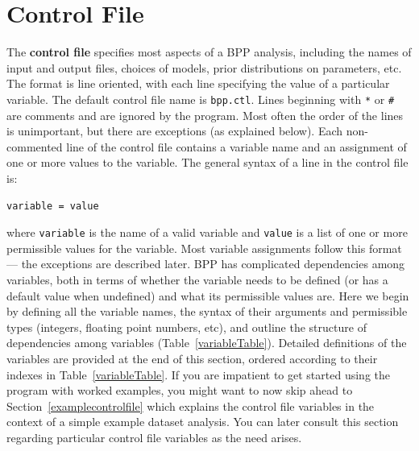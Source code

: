 \documentclass[a4paper]{book}
\numberwithin{equation}{section} \renewcommand{\baselinestretch}{0.55}
\begin{document}
\section{Control File} \label{ctrlfile} The \textbf{control file} specifies
most aspects of a BPP analysis, including the names of input and
output files, choices of models, prior distributions on parameters,
etc.  The format is line oriented, with each line specifying the value
of a particular variable.  The default control file name is
\texttt{bpp.ctl}.  Lines beginning with \texttt{*} or \texttt{\#} are
comments and are ignored by the program.  Most often the order of the
lines is unimportant, but there are exceptions (as explained
below). Each non-commented line of the control file contains a
variable name and an assignment of one or more values to the
variable. The general syntax of a line in the control file is:
\begin{verbatim}
variable = value
\end{verbatim}
where \texttt{variable} is the name of a valid variable and
\texttt{value} is a list of one or more permissible values for the
variable.  Most variable assignments follow this format --- the
exceptions are described later.  BPP has complicated dependencies
among variables, both in terms of whether the variable needs to be
defined (or has a default value when undefined) and what
its permissible values are. Here we begin by defining
all the variable names, the syntax of their arguments and permissible
types (integers, floating point numbers, etc), and outline the
structure of dependencies among variables
(Table~\ref{variableTable}). Detailed definitions of the variables are
provided at the end of this section, ordered according to their
indexes in Table~\ref{variableTable}. If you are impatient to get started
using the program with worked examples, you might want to now skip
ahead to Section~\ref{examplecontrolfile} which explains the control
file variables in the context of a simple example dataset analysis.
You can later consult this section regarding particular
control file variables as the need arises.
\end{document}
